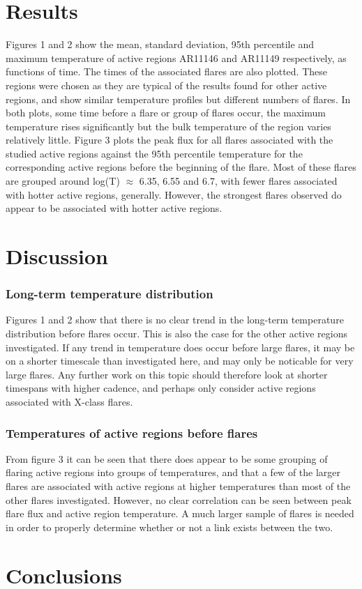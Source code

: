 \documentclass{article}
\begin{document}
\section{Results}
Figures 1 and 2 show the mean, standard deviation, 95th percentile and maximum temperature of active regions AR11146 and AR11149 respectively, as functions of time.
The times of the associated flares are also plotted. These regions were chosen as they are typical of the results found for other active regions, and show similar temperature profiles but different numbers of flares. In both plots, some time before a flare or group of flares occur, the maximum temperature rises significantly but the bulk temperature of the region varies relatively little.
Figure 3 plots the peak flux for all flares associated with the studied active regions against the 95th percentile temperature for the corresponding active regions before the beginning of the flare.
Most of these flares are grouped around log(T) $\approx$ 6.35, 6.55 and 6.7, with fewer flares associated with hotter active regions, generally.
However, the strongest flares observed do appear to be associated with hotter active regions.

\section{Discussion}

\subsubsection{Long-term temperature distribution}
Figures 1 and 2 show that there is no clear trend in the long-term temperature distribution before flares occur.
This is also the case for the other active regions investigated. If any trend in temperature does occur before large flares, it may be on a shorter timescale than investigated here, and may only be noticable for very large flares.
Any further work on this topic should therefore look at shorter timespans with higher cadence, and perhaps only consider active regions associated with X-class flares.

\subsubsection{Temperatures of active regions before flares}
From figure 3 it can be seen that there does appear to be some grouping of flaring active regions into groups of temperatures, and that a few of the larger flares are associated with active regions at higher temperatures than most of the other flares investigated.
However, no clear correlation can be seen between peak flare flux and active region temperature.
A much larger sample of flares is needed in order to properly determine whether or not a link exists between the two.

\section{Conclusions}



\end{document}
